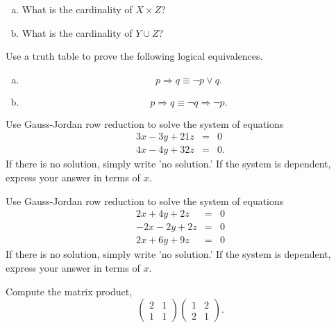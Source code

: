\documentclass[12pt]{amsart}
\begin{document}
\begin{thm}[10 Points]
  \begin{enumerate}[(a)]
  \item
    What is the cardinality of $X \times Z$?
    \vspace{1in}
  \item
    What is the cardinality of $Y \cup Z$?
    \vspace{1in}
  \end{enumerate}
\end{thm}
\newpage

\begin{thm}[10 Points]\label{ex9}
  Use a truth table to prove the following logical equivalences.
  \begin{enumerate}[(a)]
  \item
    $$p \Rightarrow q \equiv \neg p \vee q.$$
    \vspace{2in}
  \item
    $$p \Rightarrow q \equiv \neg q \Rightarrow \neg p.$$
    \vspace{2in}
  \end{enumerate}
\end{thm}

\newpage
\begin{thm}[15 Points]\label{ex2}
  Use Gauss-Jordan row reduction to solve the system of equations
  \begin{eqnarray*}
    3x - 3y + 21z &=& 0\\
    4x - 4y + 32z &=& 0.
  \end{eqnarray*}
  If there is no solution, simply write 'no solution.'  If the system is dependent, express your answer in terms of $x$.
  \vspace{2in}
\end{thm}

\begin{thm}[15 Points]\label{ex3}
  Use Gauss-Jordan row reduction to solve the system of equations
  \begin{eqnarray*}
    2x + 4y + 2z &=& 0\\
    -2x - 2y + 2z &=& 0\\
    2x + 6y + 9z  &=& 0
  \end{eqnarray*}
  If there is no solution, simply write 'no solution.'  If the system is dependent, express your answer in terms of $x$.
\end{thm}

\newpage

\begin{thm}[10 Points]\label{ex4}
  Compute the matrix product,
  $$\left(\begin{array}{cc}
    2 & 1\\
    1 & 1
  \end{array}\right)
  \left(\begin{array}{cc}
    1 & 2\\
    2 & 1
  \end{array}\right).$$
  \vspace{2in}
\end{thm}
\end{document}
